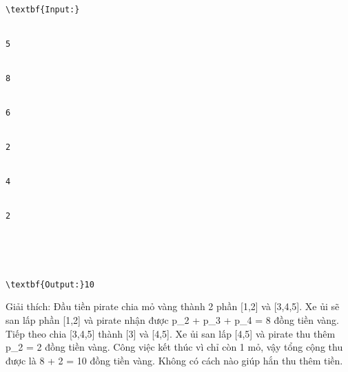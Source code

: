 \begin{verbatim}
\textbf{Input:}


5


8


6


2


4


2





\textbf{Output:}10
\end{verbatim}

   Giải thích: Đầu tiền pirate chia mỏ vàng thành 2 phần [1,2] và [3,4,5]. Xe ủi sẽ san lấp phần [1,2] và pirate nhận được p\_2 + p\_3 + p\_4 =  8 đồng tiền vàng. Tiếp theo chia [3,4,5] thành [3] và [4,5]. Xe ủi san lấp [4,5] và pirate thu thêm p\_2 = 2 đồng tiền vàng. Công việc kết thúc vì chỉ còn 1 mỏ, vậy tổng cộng thu được là 8 + 2 = 10 đồng tiền vàng. Không có cách nào giúp hắn thu thêm tiền.